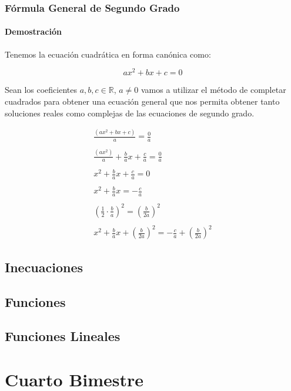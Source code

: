 \documentclass[letterpaper, 10pt, oneside]{book}
\begin{document}
	\section{Fórmula General de Segundo Grado}
	\subsection{Demostración}
	
	Tenemos la ecuación cuadrática en forma canónica como:
	
	$$ax^2+bx+c=0$$
	
	Sean los coeficientes $a,b,c \in \mathbb{R}$, $a\neq0$ vamos a utilizar el método de completar cuadrados para obtener una ecuación general que nos permita obtener tanto soluciones reales como complejas de las ecuaciones de segundo grado. 
	
	\begin{align*}
		\frac{(ax^2+bx+c)}{a}=\frac{0}{a}\\ \\
		\frac{(ax^2)}{a}+\frac{b}{a} x+\frac{c}{a}=\frac{0}{a}\\ \\
		x^2+\frac{b}{a}x+\frac{c}{a}=0\\ \\
		x^2+\frac{b}{a}x=-\frac{c}{a}\\ \\
		\left(\frac{1}{2}\cdot \frac{b}{a}\right)^2=\left(\frac{b}{2a}\right)^2\\ \\
		x^2+\frac{b}{a}x+\left(\frac{b}{2a}\right)^2=-\frac{c}{a}+\left(\frac{b}{2a}\right)^2
	\end{align*}
	\chapter{Inecuaciones}
	\chapter{Funciones}
	\chapter{Funciones Lineales}
	\part{Cuarto Bimestre}
\end{document}
